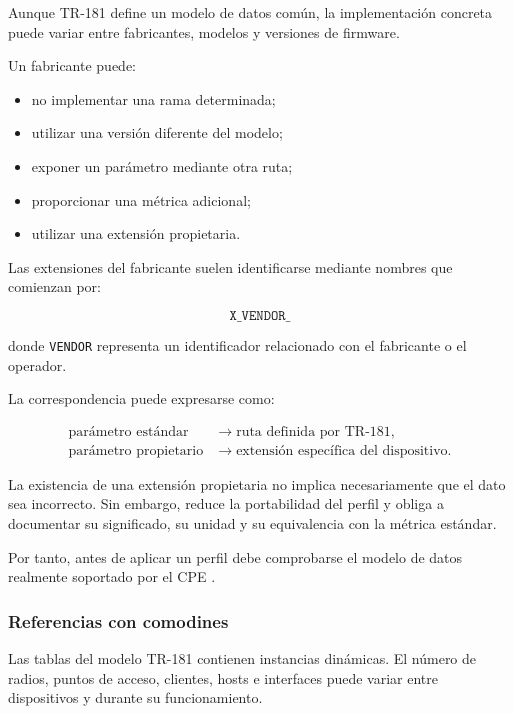 Aunque TR-181 define un modelo de datos común, la implementación concreta
puede variar entre fabricantes, modelos y versiones de firmware.

Un fabricante puede:

\begin{itemize}
    \item no implementar una rama determinada;

    \item utilizar una versión diferente del modelo;

    \item exponer un parámetro mediante otra ruta;

    \item proporcionar una métrica adicional;

    \item utilizar una extensión propietaria.
\end{itemize}

Las extensiones del fabricante suelen identificarse mediante nombres que
comienzan por:

\[
    \texttt{X\_VENDOR\_}
\]

donde \texttt{VENDOR} representa un identificador relacionado con el
fabricante o el operador.

La correspondencia puede expresarse como:

\[
\begin{aligned}
    \text{parámetro estándar}
    &\longrightarrow
    \text{ruta definida por TR-181},\\
    \text{parámetro propietario}
    &\longrightarrow
    \text{extensión específica del dispositivo}.
\end{aligned}
\]

La existencia de una extensión propietaria no implica necesariamente que
el dato sea incorrecto. Sin embargo, reduce la portabilidad del perfil y
obliga a documentar su significado, su unidad y su equivalencia con la
métrica estándar.

Por tanto, antes de aplicar un perfil debe comprobarse el modelo de datos
realmente soportado por el CPE \cite{telcox_bulkdata}.


\subsubsection*{Referencias con comodines}

Las tablas del modelo TR-181 contienen instancias dinámicas. El número de
radios, puntos de acceso, clientes, hosts e interfaces puede variar entre
dispositivos y durante su funcionamiento.


